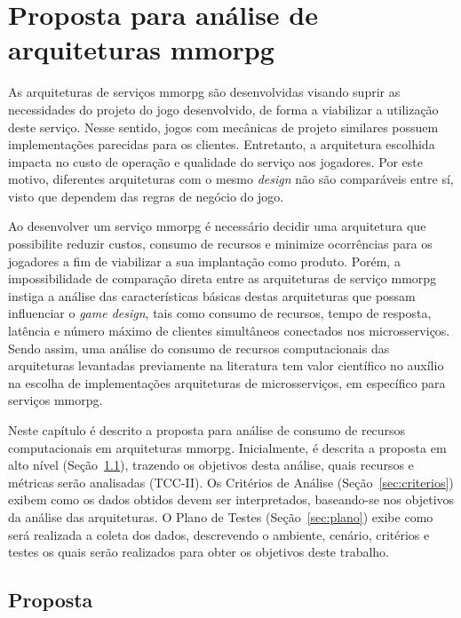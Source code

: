 \chapter{Proposta para análise de arquiteturas \ac{mmorpg}}
\label{cap3}



As arquiteturas de serviços \ac{mmorpg} são desenvolvidas visando suprir as necessidades do projeto do jogo desenvolvido, de forma a viabilizar a utilização deste serviço.
%
Nesse sentido, jogos com mecânicas de projeto similares possuem implementações parecidas para os clientes.
%
Entretanto, a arquitetura escolhida impacta no custo de operação e qualidade do serviço aos jogadores.
%
Por este motivo, diferentes arquiteturas com o mesmo \textit{design} não são comparáveis entre sí, visto que dependem das regras de negócio do jogo.



Ao desenvolver um serviço \ac{mmorpg} é necessário decidir uma arquitetura que possibilite reduzir custos, consumo de recursos e minimize ocorrências para os jogadores a fim de viabilizar a sua implantação como produto.
%
Porém, a impossibilidade de comparação direta entre as arquiteturas de serviço \ac{mmorpg} instiga a análise das características básicas destas arquiteturas que possam influenciar o \textit{game design}, tais como consumo de recursos, tempo de resposta, latência e número máximo de clientes simultâneos conectados nos microsserviços.
%
Sendo assim, uma análise do consumo de recursos computacionais das arquiteturas levantadas previamente na literatura tem valor científico no auxílio na escolha de implementações arquiteturas de microsserviços, em específico para serviços \ac{mmorpg}.



Neste capítulo é descrito a proposta para análise de consumo de recursos computacionais em arquiteturas \ac{mmorpg}.
%
Inicialmente, é descrita a proposta em alto nível (Seção~\ref{sec:proposta}), trazendo os objetivos desta análise, quais recursos e métricas serão analisadas (TCC-II).
%
Os Critérios de Análise (Seção~\ref{sec:criterios}) exibem como os dados obtidos devem ser interpretados, baseando-se nos objetivos da análise das arquiteturas.
%
O Plano de Testes (Seção~\ref{sec:plano}) exibe como será realizada a coleta dos dados, descrevendo o ambiente, cenário, critérios e testes os quais serão realizados para obter os objetivos deste trabalho.
%

\section{Proposta}
\label{sec:proposta}

